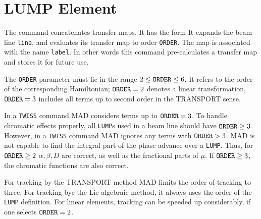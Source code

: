 \section{LUMP Element}
\label{S-LUMP}
The command  concatenates transfer maps.
It has the form
It expands the beam line {\tt line},
and evaluates its transfer map to order {\tt ORDER}.
The map is associated with the name {\tt label}.
In other words this command pre-calculates a transfer map and
stores it for future use.
 
The {\tt ORDER} parameter must lie in the range
\(2\leq \hbox{\tt ORDER}\leq 6\).
It refers to the order of the corresponding Hamiltonian;
\(\hbox{\tt ORDER}=2\) denotes a linear transformation,
\(\hbox{\tt ORDER}=3\) includes all terms up to second order
in the TRANSPORT sense.
 
In a {\tt TWISS} command MAD considers terms up to \(\hbox{\tt ORDER}=3\).
To handle chromatic effects properly,
all {\tt LUMP}s used in a beam line should have \(\hbox{\tt ORDER}\geq 3\).
However, in a {\tt TWISS} command MAD ignores any terms with
\(\hbox{\tt ORDER}>3\).
MAD is not capable to find the integral part of the phase advance
over a {\tt LUMP}.
Thus, for \(\hbox{\tt ORDER}\geq 2\) \(\alpha,\beta,D\) are correct,
as well as the fractional parts of \(\mu\).
If \(\hbox{\tt ORDER}\geq 3\), the chromatic functions are also correct.
 
For tracking by the TRANSPORT method MAD limits the order of tracking
to three.
For tracking bye the Lie-algebraic method, it always uses the order
of the {\tt LUMP} definition.
For linear elements, tracking can be speeded up considerably,
if one selects \(\hbox{\tt ORDER}=2\).
 
